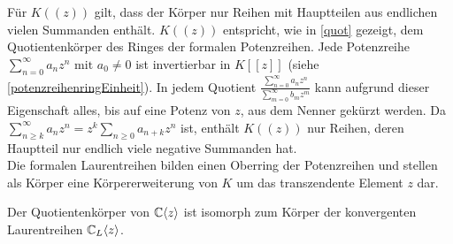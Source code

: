 %
%
Für $K((z))$ gilt, dass der Körper nur Reihen mit Hauptteilen aus endlichen vielen Summanden enthält. $K((z))$ entspricht, wie in \ref{quot} gezeigt, dem Quotientenkörper des Ringes der formalen Potenzreihen.  
Jede Potenzreihe $\sum_{n=0}^{\infty} a_nz^n \text{ mit } a_0\neq0$ ist invertierbar in $K[[z]]$ (siehe \ref{potenzreihenringEinheit}). In jedem Quotient $\frac{\sum_{n=0}^{\infty}  a_nz^n}{\sum_{m=0}^\infty b_mz^m}$ kann aufgrund dieser Eigenschaft alles, bis auf eine Potenz von $z$, aus dem Nenner gekürzt werden. Da  $\sum_{n \ge k}^{\infty} a_nz^n =z^k \sum_{n \ge 0} a_{n+k}z^n$ ist, enthält $K((z))$ nur Reihen, deren Hauptteil nur endlich viele negative Summanden hat. \\
%
Die formalen Laurentreihen bilden einen Oberring der Potenzreihen und stellen als Körper eine Körpererweiterung von $K$ um das transzendente Element $z$ dar.  %
%
%
\begin{satz}
Der Quotientenkörper von  $\mathbb{C}\langle z\rangle$ ist isomorph zum Körper der konvergenten Laurentreihen $\mathbb{C}_L \langle z \rangle$.
\end{satz}
